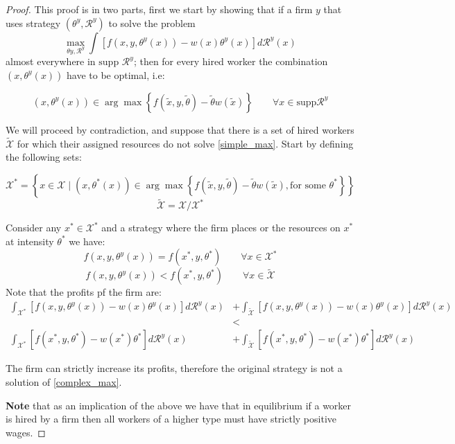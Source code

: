 \documentclass[12pt]{article}
\theoremstyle{definition}
\begin{document}
\begin{proof}
This proof is in two parts, first we start by showing that if a firm $y$ that uses strategy $(\theta^y, \mathcal{R}^y)$ to solve the problem 
\begin{equation}\label{complex_max}
\max _{\theta y, \mathcal{R}^{y}} \int\left[f\left(x, y, \theta^{y}(x)\right)-w(x) \theta^{y}(x)\right] d \mathcal{R}^{y}(x)
\end{equation}
almost everywhere in $\text{supp } \mathcal{R}^y$; then for every hired worker the combination $(x,\theta^y(x))$ have to be optimal, i.e:

\begin{equation}\label{simple_max}
(x,\theta^y(x)) \in \arg\max \left\{ f(\tilde{x}, y, \tilde{\theta})-\tilde{\theta} w(\tilde{x}) \right \} \qquad \forall x\in \text{supp}\mathcal{R}^y
\end{equation}

We will proceed by contradiction, and suppose that there is a set of hired workers $\tilde{\mathcal{X}}$ for which their assigned resources do not solve \eqref{simple_max}. Start by defining the following sets:

$$\mathcal{X}^*=\left\{x\in \mathcal{X}\mid (x,\theta^*(x)) \in \arg\max \left\{ f(\tilde{x}, y, \tilde{\theta})-\tilde{\theta} w(\tilde{x}) , \text{for some } \theta^*\right \} \right\}$$ $$\tilde{\mathcal{X}} = \mathcal{X} / \mathcal{X}^*$$

Consider any $x^* \in \mathcal{X}^*$ and a strategy where the firm places or the resources on $x^*$ at intensity $\theta^*$ we have:
$$f(x,y,\theta^y(x)) = f(x^*, y, \theta^*) \qquad \forall x\in \mathcal{X}^*$$
$$f(x,y,\theta^y(x)) < f(x^*, y, \theta^*) \qquad \forall x\in \tilde{\mathcal{X}}$$
Note that the profits pf the firm are:
\begin{align*}
\int_{\mathcal{X}^*}\left[f(x,y,\theta^y(x)) - w(x)\theta^y(x)\right]d\mathcal{R}^y(x) &+ \int_{\tilde{\mathcal{X}}}\left[f(x,y,\theta^y(x)) - w(x)\theta^y(x)\right]d\mathcal{R}^y(x)\\
&<\\
\int_{\mathcal{X}^*}\left[f(x^*,y,\theta^*) - w(x^*)\theta^*\right]d\mathcal{R}^y(x) &+ \int_{\tilde{\mathcal{X}}}\left[f(x^*,y,\theta^*) - w(x^*)\theta^*\right]d\mathcal{R}^y(x)
\end{align*}

The firm can strictly increase its profits, therefore the original strategy is not a solution of \eqref{complex_max}.

\textbf{Note} that as an implication of the above we have that in equilibrium if a worker is hired by a firm then all workers of a higher type must have strictly positive wages.


\end{proof}
\end{document}
